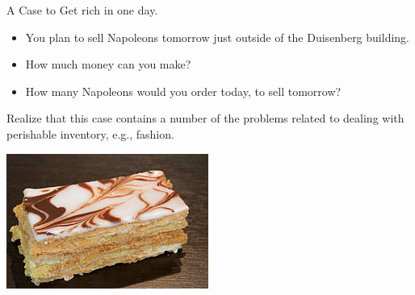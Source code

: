 \begin{exercise} A Case to  Get rich in one day. 

  \begin{itemize}
  \item You plan to sell Napoleons tomorrow just outside of the
    Duisenberg building.
  \item How much money can you make? 
  \item How many Napoleons would you order today, to sell tomorrow?
  \end{itemize}
  Realize that this case contains a number of the problems related to
  dealing with perishable inventory, e.g., fashion. 

   \includegraphics[scale = 1.0]{figures/mille-feuille}


\end{exercise}
